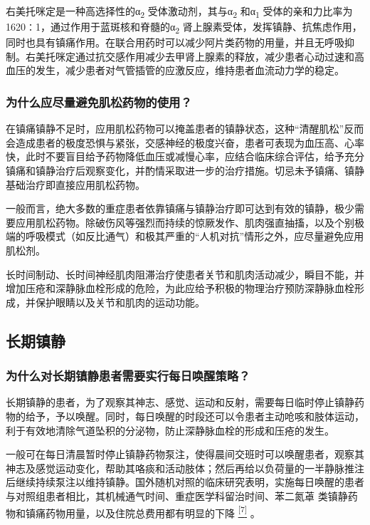 右美托咪定是一种高选择性的α\textsubscript{2}
受体激动剂，其与α\textsubscript{2} 和α\textsubscript{1}
受体的亲和力比率为1620∶1，通过作用于蓝斑核和脊髓的α\textsubscript{2}
肾上腺素受体，发挥镇静、抗焦虑作用，同时也具有镇痛作用。在联合用药时可以减少阿片类药物的用量，并且无呼吸抑制。右美托咪定通过抗交感作用减少去甲肾上腺素的释放，减少患者心动过速和高血压的发生，减少患者对气管插管的应激反应，维持患者血流动力学的稳定。

\subsubsection{为什么应尽量避免肌松药物的使用？}

在镇痛镇静不足时，应用肌松药物可以掩盖患者的镇静状态，这种“清醒肌松”反而会造成患者的极度恐惧与紧张，交感神经的极度兴奋，患者可表现为血压高、心率快，此时不要盲目给予药物降低血压或减慢心率，应结合临床综合评估，给予充分镇痛和镇静治疗后观察变化，并酌情采取进一步的治疗措施。切忌未予镇痛、镇静基础治疗即直接应用肌松药物。

一般而言，绝大多数的重症患者依靠镇痛与镇静治疗即可达到有效的镇静，极少需要应用肌松药物。除破伤风等强烈而持续的惊厥发作、肌肉强直抽搐，以及个别极端的呼吸模式（如反比通气）和极其严重的“人机对抗”情形之外，应尽量避免应用肌松剂。

长时间制动、长时间神经肌肉阻滞治疗使患者关节和肌肉活动减少，瞬目不能，并增加压疮和深静脉血栓形成的危险，为此应给予积极的物理治疗预防深静脉血栓形成，并保护眼睛以及关节和肌肉的运动功能。

\subsection{长期镇静}

\subsubsection{为什么对长期镇静患者需要实行每日唤醒策略？}

长期镇静的患者，为了观察其神志、感觉、运动和反射，需要每日临时停止镇静药物的给予，予以唤醒。同时，每日唤醒的时段还可以令患者主动呛咳和肢体运动，利于有效地清除气道坠积的分泌物，防止深静脉血栓的形成和压疮的发生。

一般可在每日清晨暂时停止镇静药物泵注，使得晨间交班时可以唤醒患者，观察其神志及感觉运动变化，帮助其咯痰和活动肢体；然后再给以负荷量的一半静脉推注后继续持续泵注以维持镇静。国外随机对照的临床研究表明，实施每日唤醒的患者与对照组患者相比，其机械通气时间、重症医学科留治时间、苯二氮䓬
类镇静药物和镇痛药物用量，以及住院总费用都有明显的下降
\protect\hyperlink{text00027.htmlux5cux23ch7-26}{\textsuperscript{{[}7{]}}}
。

